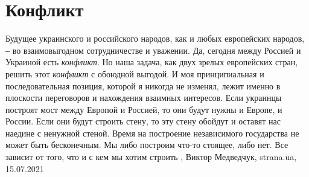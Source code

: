  
 
 
 
 
\chapter{Конфликт}
\label{sec:slova.konflikt}

Будущее украинского и российского народов, как и любых европейских народов, ‒
во взаимовыгодном сотрудничестве и уважении. Да, сегодня между Россией и
Украиной есть \emph{конфликт}. Но наша задача, как двух зрелых европейских стран,
решить этот \emph{конфликт} с обоюдной выгодой. И моя принципиальная и
последовательная позиция, которой я никогда не изменял, лежит именно в
плоскости переговоров и нахождения взаимных интересов. Если украинцы построят
мост между Европой и Россией, то они будут нужны и Европе, и России. Если они
будут строить стену, то эту стену обойдут и оставят нас наедине с ненужной
стеной. Время на построение независимого государства не может быть бесконечным.
Мы либо построим что-то стоящее, либо нет. Все зависит от того, что и с кем мы
хотим строить
, 
Виктор Медведчук, strana.ua, 15.07.2021

